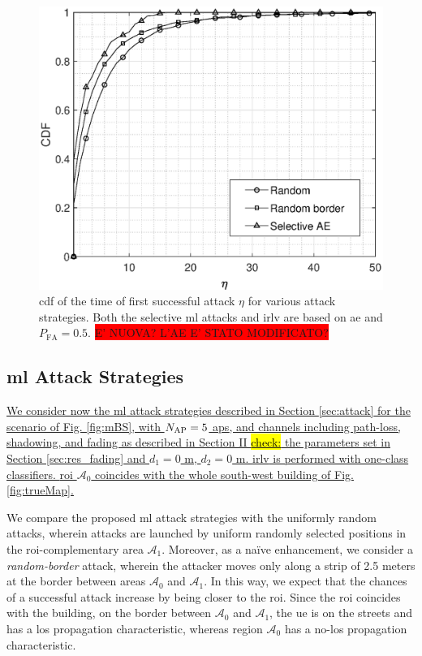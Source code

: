 \documentclass[draftcls,onecolumn,12pt]{IEEEtran}
\begin{document}
\begin{figure}[t]
    \centering
    \includegraphics[width=0.6\columnwidth]{res_selective_AE.eps}
    \caption{\ac{cdf} of the time of first successful attack $\eta$ for various attack strategies. Both the selective \ac{ml} attacks  and \ac{irlv} are based on \ac{ae} and $P_{\text{FA}}= 0.5$. \colorbox{red}{E' NUOVA? L'AE E' STATO MODIFICATO?}}
    \label{fig:selectiveAE}
\end{figure}



\subsection{\ac{ml} Attack Strategies}

\uline{We consider now the \ac{ml} attack strategies described in Section \ref{sec:attack} for the scenario of Fig. \ref{fig:mBS}, with $N_{\rm AP} =5$ \acp{ap}, and channels including path-loss, shadowing, and fading as described in Section II \hl{check:} the parameters set in  Section \ref{sec:res_fading} and $d_1=0$ m, $d_2=0$ m.  \ac{irlv} is  performed with one-class classifiers.  \ac{roi} $\mathcal A_0$ coincides with the whole south-west building of Fig. \ref{fig:trueMap}. } 


We compare the proposed \ac{ml} attack strategies with the uniformly random attacks, wherein attacks are launched by uniform randomly selected positions in the \ac{roi}-complementary area $\mathcal{A}_1$.  Moreover, as a na\"ive enhancement, we consider a \emph{random-border} attack, wherein the attacker moves only along a strip of 2.5 meters at the border between areas $\mathcal{A}_0$ and $\mathcal A_1$. In this way, we expect that the chances of a successful attack increase by being closer to the \ac{roi}. Since the \ac{roi} coincides with the building, on the border between $\mathcal A_0$ and $\mathcal A_1$, the \ac{ue} is on the streets and has a \ac{los} propagation characteristic, whereas region $\mathcal A_0$ has a no-\ac{los} propagation characteristic. 
\end{document}
